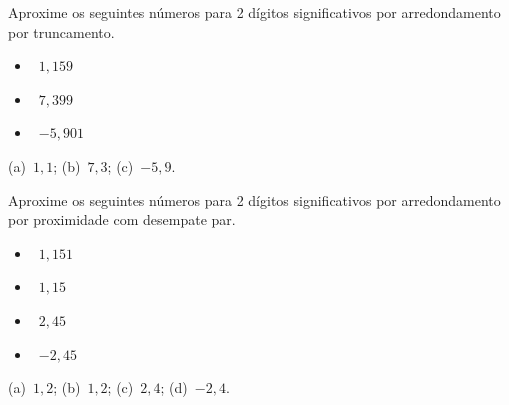\begin{exer}
  Aproxime os seguintes números para 2 dígitos significativos por arredondamento por truncamento.
  \begin{itemize}
  \item[(a)]~$1,159$
  \item[(b)]~$7,399$
  \item[(c)]~$-5,901$
  \end{itemize}
\end{exer}
\begin{resp}
  (a)~$1,1$; (b)~$7,3$; (c)~$-5,9$.
\end{resp}

\begin{exer}
  Aproxime os seguintes números para 2 dígitos significativos por arredondamento por proximidade com desempate par.
  \begin{itemize}
  \item[(a)]~$1,151$
  \item[(b)]~$1,15$
  \item[(c)]~$2,45$
  \item[(d)]~$-2,45$
  \end{itemize}
\end{exer}
\begin{resp}
  (a)~$1,2$; (b)~$1,2$; (c)~$2,4$; (d)~$-2,4$.
\end{resp}

